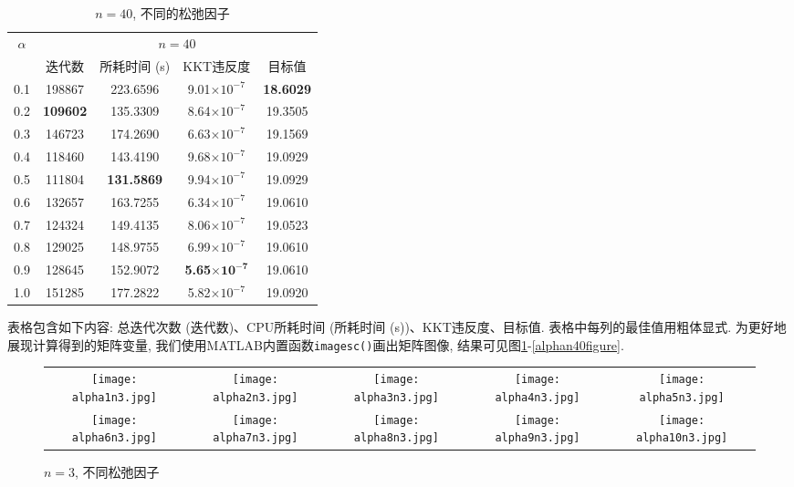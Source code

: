 \begin{table}[htbp]
	\renewcommand{\captionfont}{\small}
    \centering
    \caption{$n=40$, 不同的松弛因子}
    \label{n40alpha}
    \vskip 4mm
    \begin{tabular}{c|c|c|c|c}
        \hline
        \multirow{2}{*}{$\alpha$} & \multicolumn{4}{c}{$n=40$}\\\cline{2-5}
          & 迭代数 & 所耗时间 (s) & KKT违反度 & 目标值\\\hline
        0.1 & 198867 & 223.6596 & 9.01$\times10^{-7}$ & \textbf{18.6029} \\\hline
        0.2 & \textbf{109602} & 135.3309 & 8.64$\times10^{-7}$ & 19.3505 \\\hline
        0.3 & 146723 & 174.2690 & 6.63$\times10^{-7}$ & 19.1569 \\\hline
        0.4 & 118460 & 143.4190 & 9.68$\times10^{-7}$ & 19.0929 \\\hline
        0.5 & 111804 & \textbf{131.5869} & 9.94$\times10^{-7}$ & 19.0929 \\\hline
        0.6 & 132657 & 163.7255 & 6.34$\times10^{-7}$ & 19.0610 \\\hline
        0.7 & 124324 & 149.4135 & 8.06$\times10^{-7}$ & 19.0523 \\\hline
        0.8 & 129025 & 148.9755 & 6.99$\times10^{-7}$ & 19.0610 \\\hline
        0.9 & 128645 & 152.9072 & \textbf{5.65$\mathbf{\times10^{-7}}$} & 19.0610 \\\hline
        1.0 & 151285 & 177.2822 & 5.82$\times10^{-7}$ & 19.0920 \\\hline
    \end{tabular}
\end{table}
表格包含如下内容: 总迭代次数 (迭代数)、CPU所耗时间 (所耗时间 (s))、KKT违反度、目标值. 表格中每列的最佳值用粗体显式. 为更好地展现计算得到的矩阵变量, 我们使用MATLAB内置函数\texttt{imagesc()}画出矩阵图像, 结果可见图\ref{alphan3figure}-\ref{alphan40figure}. 
\begin{figure}[htbp]
	\renewcommand{\captionfont}{\small}
	\centering
	\begin{tabular}{@{}ccccc@{}}
		\texttt{[image: alpha1n3.jpg]} & 
		\texttt{[image: alpha2n3.jpg]} & 
		\texttt{[image: alpha3n3.jpg]} & 
		\texttt{[image: alpha4n3.jpg]} & 
		\texttt{[image: alpha5n3.jpg]}\\
		\texttt{[image: alpha6n3.jpg]} & 
		\texttt{[image: alpha7n3.jpg]} &
		\texttt{[image: alpha8n3.jpg]} & 
		\texttt{[image: alpha9n3.jpg]} & 
		\texttt{[image: alpha10n3.jpg]}
	\end{tabular}
	\caption{$n=3$, 不同松弛因子}
	\label{alphan3figure}
\end{figure}

